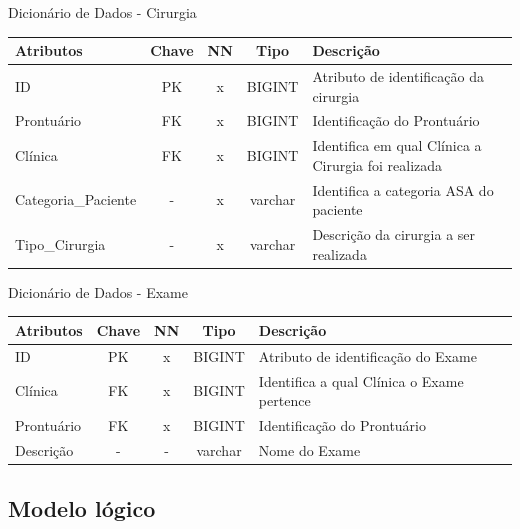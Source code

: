 \documentclass[
    12pt,               %
    openright,          %
    oneside,
    a4paper,            %
    BIBLATEX,           %
    TODO,               %
    english,            %
    brazil              %
    ]{ifsp-spo-inf-ctds}
\begin{document}
   \begin{center}
      \begin{quadro}[H]
      \centering
          \caption{Dicionário de Dados - Cirurgia}
          \begin{tabulary}{1.0\textwidth}{|p{9em}|c|c|c|p{19em}|}
        \hline
        Atributos & Chave & NN & Tipo & Descrição\\
        \hline
        ID & PK & x & BIGINT & Atributo de identificação da cirurgia\\
        \hline
        Prontuário & FK & x & BIGINT & Identificação do Prontuário \\
        \hline
        Clínica & FK & x & BIGINT & Identifica em qual Clínica a Cirurgia foi realizada\\
        \hline
        Categoria\_Paciente & - & x & varchar & Identifica a categoria ASA do paciente \\
        \hline
        Tipo\_Cirurgia & - & x & varchar & Descrição da cirurgia a ser realizada \\
        \hline
        \end{tabulary}
         
          \label{qd: md-Cirurgia}
      \end{quadro}
    \end{center}
    \begin{center}
      \begin{quadro}[H]
      \centering
          \caption{Dicionário de Dados - Exame}
          \begin{tabulary}{1.0\textwidth}{|p{9em}|c|c|c|p{19em}|}
        \hline
        Atributos & Chave & NN & Tipo & Descrição\\
        \hline
        ID & PK & x & BIGINT & Atributo de identificação do Exame\\
        \hline
        Clínica & FK & x & BIGINT & Identifica a qual Clínica o Exame pertence\\
        \hline
        Prontuário & FK & x & BIGINT & Identificação do Prontuário \\
        \hline
        Descrição & - & - & varchar & Nome do Exame \\
        \hline
        \end{tabulary}
         
          \label{qd: md-Exame}
      \end{quadro}
    \end{center}
    
        \subsection{Modelo lógico}
        
\end{document}
